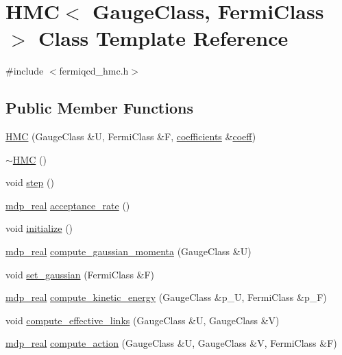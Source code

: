 \hypertarget{class_h_m_c}{}\section{H\+MC$<$ Gauge\+Class, Fermi\+Class $>$ Class Template Reference}
\label{class_h_m_c}


{\ttfamily \#include $<$fermiqcd\+\_\+hmc.\+h$>$}

\subsection*{Public Member Functions}
\begin{DoxyCompactItemize}
\item 
\hyperlink{class_h_m_c_aafdc157997f16364f023298ed1de48cb}{H\+MC} (Gauge\+Class \&U, Fermi\+Class \&F, \hyperlink{classcoefficients}{coefficients} \&\hyperlink{class_h_m_c_aa7a373acc998a08fcdc2e86dc6084b7b}{coeff})
\item 
\hyperlink{class_h_m_c_add3a4a1409a737ccea8c7dae3760d0b3}{$\sim$\+H\+MC} ()
\item 
void \hyperlink{class_h_m_c_a97646bc15efc4db6c69e52f19f058ccd}{step} ()
\item 
\hyperlink{mdp__global__vars_8h_a69d96b74c791e0bbdb888b3913a69450}{mdp\+\_\+real} \hyperlink{class_h_m_c_a29d58281eca79c9fdc0f6160d4c61b53}{acceptance\+\_\+rate} ()
\item 
void \hyperlink{class_h_m_c_a796aa70365c8befa06b6e9a6064b332d}{initialize} ()
\item 
\hyperlink{mdp__global__vars_8h_a69d96b74c791e0bbdb888b3913a69450}{mdp\+\_\+real} \hyperlink{class_h_m_c_aaf6eb48e4a79b5c65b7fd80e9f34f072}{compute\+\_\+gaussian\+\_\+momenta} (Gauge\+Class \&U)
\item 
void \hyperlink{class_h_m_c_af2e951741710132d0bca8bc9d7fdd463}{set\+\_\+gaussian} (Fermi\+Class \&F)
\item 
\hyperlink{mdp__global__vars_8h_a69d96b74c791e0bbdb888b3913a69450}{mdp\+\_\+real} \hyperlink{class_h_m_c_a278a4514882a4b585797364c6c7c1ba2}{compute\+\_\+kinetic\+\_\+energy} (Gauge\+Class \&p\+\_\+U, Fermi\+Class \&p\+\_\+F)
\item 
void \hyperlink{class_h_m_c_a4d455373ccf133c6a7bb59c13bc6db32}{compute\+\_\+effective\+\_\+links} (Gauge\+Class \&U, Gauge\+Class \&V)
\item 
\hyperlink{mdp__global__vars_8h_a69d96b74c791e0bbdb888b3913a69450}{mdp\+\_\+real} \hyperlink{class_h_m_c_a28b4077c0a378abdbc3a75b27b6ec66c}{compute\+\_\+action} (Gauge\+Class \&U, Gauge\+Class \&V, Fermi\+Class \&F)

\end{DoxyCompactItemize}
